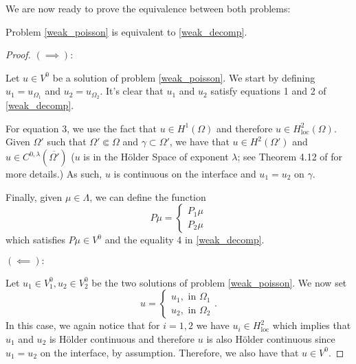 We are now ready to prove the equivalence between both problems:
\begin{theorem}\label{equivalence_transmission}
    Problem \eqref{weak_poisson} is equivalent to \eqref{weak_decomp}.
\end{theorem}
\begin{proof}
    \((\implies):\)

    Let \(u \in V^0\) be a solution of problem \eqref{weak_poisson}. We start by defining \(u_1 = u_{\Omega_1}\) and \(u_2 = u_{\Omega_2}\). It's clear that \(u_1\) and \(u_2\) satisfy equations 1 and 2 of \eqref{weak_decomp}. 
    
    For equation 3, we use the fact that \(u \in H^1(\Omega)\) and therefore \(u \in H^2_{\text{loc}}(\Omega)\). Given \(\Omega'\) such that \(\Omega' \Subset \Omega\) and \(\gamma \subset \Omega'\), we have that \(u \in H^2(\Omega')\) and \(u \in C^{0,\lambda}(\overline{\Omega'})\) (\(u\) is in the H\"{o}lder Space of exponent \(\lambda\); see Theorem 4.12 of \cite{adams2003sobolev} for more details.) As such, \(u\) is continuous on the interface and \(u_1=u_2\) on \(\gamma\).

    Finally, given \(\mu \in \Lambda\), we can define the function
    \[
        P \mu =
    \begin{cases}
        P_1 \mu\\
        P_2 \mu
    \end{cases}
    \]
    which satisfies \(P \mu \in V^0\) and the equality 4 in \eqref{weak_decomp}.

    \vspace*{0.5cm}
    \((\impliedby):\)

    Let \(u_1 \in V_1^0, u_2 \in V_2^0\) be the two solutions of problem \eqref{weak_poisson}. We now set
    \[
    u=\begin{cases}
        u_1, \text{ in } \Omega_1\\
        u_2, \text{ in } \Omega_2
    \end{cases}.
    \]
    In this case, we again notice that for \(i=1, 2\) we have \(u_i \in H^2_{\text{loc}}\) which implies that \(u_1\) and \(u_2\) is H\"{o}lder continuous and therefore \(u\) is also H\"{o}lder continuous since \(u_1 = u_2\) on the interface, by assumption. Therefore, we also have that \(u \in V^0\). 
    

\end{proof}
